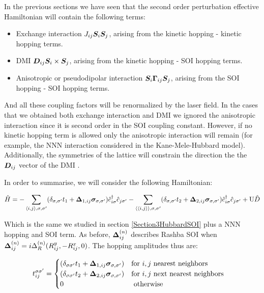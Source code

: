 In the previous sections we have seen that the second order perturbation effective Hamiltonian will contain the following terms:

\begin{itemize}
	\item Exchange interaction $J_{ij} \boldsymbol{S}_i \boldsymbol{S}_j$, arising from the kinetic hopping - kinetic hopping terms.
	\item DMI $\boldsymbol{D}_{ij} \boldsymbol{S}_i \times \boldsymbol{S}_j$, arising from the kinetic hopping - SOI hopping terms.
	\item Anisotropic or pseudodipolar interaction $\boldsymbol{S}_i \boldsymbol{\Gamma}_{ij} \boldsymbol{S}_j$, arising from the SOI hopping - SOI hopping terms.
\end{itemize}

And all these coupling factors will be renormalized by the laser field. In the cases that we obtained both exchange interaction and DMI we ignored the anisotropic interaction since it is second order in the SOI coupling constant. However, if no kinetic hopping term is allowed only the anisotropic interaction will remain (for example, the NNN interaction considered in the Kane-Mele-Hubbard model). Additionally, the symmetries of the lattice will constrain the direction the the $\boldsymbol{D}_{ij}$ vector of the DMI \cite{Moriya1960}. 

In order to summarise, we will consider the following Hamiltonian:

\begin{equation}
\hat{H} = -\sum_{\langle i,j \rangle, \sigma, \sigma'}(\delta_{\sigma, \sigma'} t_1 + \boldsymbol{\Delta}_{1,ij} \boldsymbol{\sigma}_{\sigma, \sigma'})\hat{c}_{i \sigma}^\dagger \hat{c}_{j \sigma'} - 
	\sum_{\langle \langle i,j \rangle \rangle, \sigma, \sigma'}(\delta_{\sigma, \sigma'} t_2 + \boldsymbol{\Delta}_{2,ij} \boldsymbol{\sigma}_{\sigma, \sigma'})\hat{c}_{i \sigma}^\dagger \hat{c}_{j \sigma'} + 
	\text{U}\hat{D}
\end{equation}

Which is the same we studied in section \ref{Section3HubbardSOI} plus a NNN hopping and SOI term. As before, $\boldsymbol{\Delta}_{ij}^{(n)}$ describes Rashba SOI when $\boldsymbol{\Delta}_{ij}^{(n)} = i\Delta_R^{(n)}(R_{ij}^y, -R_{ij}^x, 0)$.
The hopping amplitudes thus are:

\begin{equation}
\label{HoppHubbSOI}
t_{ij}^{\sigma \sigma'} = \begin{cases}
	(\delta_{\sigma \sigma'}t_1+\boldsymbol{\Delta}_{1,ij} \boldsymbol{\sigma}_{\sigma, \sigma'}) & \text{for } i, j \text{ nearest neighbors} \\
	(\delta_{\sigma \sigma'}t_2+\boldsymbol{\Delta}_{2,ij} \boldsymbol{\sigma}_{\sigma, \sigma'}) & \text{for } i, j \text{ next nearest neighbors} \\
	0 & \text{ otherwise}
\end{cases} \quad
\end{equation}

